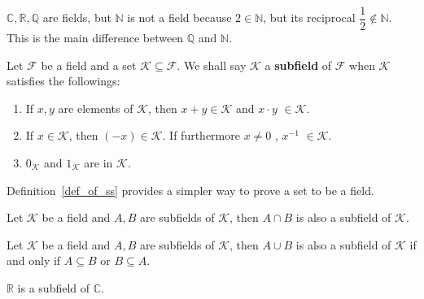 	\begin{exampleenv}
		$\mathbb{C,R,Q}$ are fields, but $\mathbb{N}$ is not a field because $2 \in \mathbb{N}$, but its reciprocal $\dfrac{1}{2} \notin \mathbb{N}$. This is the main difference between $\mathbb{Q}$ and $\mathbb{N}$.
	\end{exampleenv}
	\begin{definitionenv}\label{def_of_ss}
		Let $\mathcal{F}$ be a field and a set $\mathcal{K} \subseteq \mathcal{F}$. We shall say $\mathcal{K}$ a \textbf{subfield} of $\mathcal{F}$ when $\mathcal{K}$ satisfies the followings:
		\begin{enumerate}
			\item If $x,y$ are elements of $\mathcal{K}$, then  $x+y\in \mathcal{K}$ and $x\cdot y$ $\in \mathcal{K}$.
			\item If $x\in \mathcal{K}$, then $(-x)\in \mathcal{K}$. If furthermore $x\neq 0$ , $x^{-1}$ $\in \mathcal{K}$.
			\item $0_\mathcal{K}$ and $1_\mathcal{K}$ are in $\mathcal{K}$.
		\end{enumerate}
	\end{definitionenv}
	\begin{remarkenv}
		Definition~\ref{def_of_ss} provides a simpler way to prove a set to be a field.
	\end{remarkenv}
	\begin{propositionenv}
		Let $\mathcal{K}$ be a field and $A,B$ are subfields of $\mathcal{K}$, then $A \cap B$ is also a subfield of $\mathcal{K}$.
	\end{propositionenv}
	\begin{propositionenv}
		Let $\mathcal{K}$ be a field and $A,B$ are subfields of $\mathcal{K}$, then $A \cup B$ is also a subfield of $\mathcal{K}$ if and only if $A \subseteq B$ or $B \subseteq A$.
	\end{propositionenv}
	\begin{exampleenv}
		$\mathbb{R}$ is a subfield of $\mathbb{C}$.
	\end{exampleenv}
